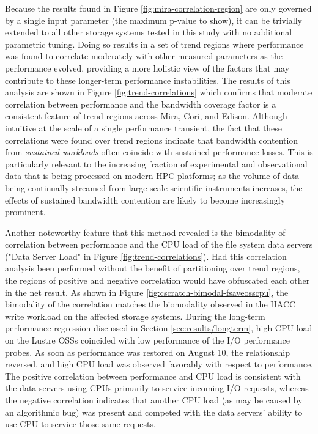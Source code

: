 Because the results found in Figure \ref{fig:mira-correlation-region} are only governed by a single input parameter (the maximum p-value to show), it can be trivially extended to all other storage systems tested in this study with no additional parametric tuning.
Doing so results in a set of trend regions where performance was found to correlate moderately with other measured parameters as the performance evolved, providing a more holistic view of the factors that may contribute to these longer-term performance instabilities.
The results of this analysis are shown in Figure \ref{fig:trend-correlations} which confirms that moderate correlation between performance and the bandwidth coverage factor is a consistent feature of trend regions across Mira, Cori, and Edison.
Although intuitive at the scale of a single performance transient, the fact that these correlations were found over trend regions indicate that bandwidth contention from \emph{sustained workloads} often coincide with sustained performance losses.
This is particularly relevant to the increasing fraction of experimental and observational data that is being processed on modern HPC platforms; as the volume of data being continually streamed from large-scale scientific instruments increases, the effects of sustained bandwidth contention are likely to become increasingly prominent.

Another noteworthy feature that this method revealed is the bimodality of correlation between performance and the CPU load of the file system data servers ("Data Server Load" in Figure \ref{fig:trend-correlations}).
Had this correlation analysis been performed without the benefit of partitioning over trend regions, the regions of positive and negative correlation would have obfuscated each other in the net result.
As shown in Figure \ref{fig:cscratch-bimodal-fsaveosscpu}, the bimodality of the correlation matches the biomodality observed in the HACC write workload on the affected storage systems.
During the long-term performance regression discussed in Section \ref{sec:results/longterm}, high CPU load on the Lustre OSSs coincided with low performance of the I/O performance probes.
As soon as performance was restored on August 10, the relationship reversed, and high CPU load was observed favorably with respect to performance.
The positive correlation between performance and CPU load is consistent with the data servers using CPUs primarily to service incoming I/O requests, whereas the negative correlation indicates that another CPU load (as may be caused by an algorithmic bug) was present and competed with the data servers' ability to use CPU to service those same requests.


